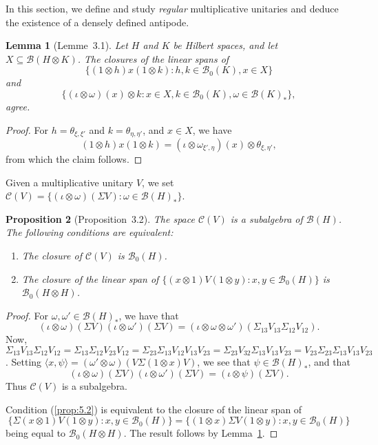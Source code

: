 \documentclass[a4paper,12pt]{article}
\theoremstyle{plain}
\newtheorem{proposition}{Proposition}[section]
\newtheorem{lemma}[proposition]{Lemma}
\theoremstyle{definition}
\newcommand{\ip}[2]{{\langle {#1} , {#2} \rangle}}
\newcommand{\mc}{\mathcal}
\begin{document}
In this section, we define and study \emph{regular} multiplicative unitaries
and deduce the existence of a densely defined antipode.

\begin{lemma}[Lemme~3.1]\label{lemma:1}
Let $H$ and $K$ be Hilbert spaces, and let $X\subseteq\mc B(H\otimes K)$.
The closures of the linear spans of
\[ \big\{ (1\otimes h)x(1\otimes k) : h,k\in\mc B_0(K), x\in X \big\} \]
and
\[ \big\{ (\iota\otimes\omega)(x)\otimes k : x\in X, k\in\mc B_0(K),
\omega\in\mc B(K)_* \big\}, \]
agree.
\end{lemma}
\begin{proof}
For $h=\theta_{\xi,\xi'}$ and $k=\theta_{\eta,\eta'}$, and $x\in X$, we have
\[ (1\otimes h)x(1\otimes k) = (\iota\otimes\omega_{\xi',\eta})(x)
\otimes \theta_{\xi,\eta'}, \]
from which the claim follows.
\end{proof}

Given a multiplicative unitary $V$, we set $\mc C(V) =
\{ (\iota\otimes\omega)(\Sigma V) : \omega\in\mc B(H)_* \}$.

\begin{proposition}[Proposition~3.2]\label{prop:5}
The space $\mc C(V)$ is a subalgebra of $\mc B(H)$.  The following conditions
are equivalent:
\begin{enumerate}
\item\label{prop:5.1} The closure of $\mc C(V)$ is $\mc B_0(H)$.
\item\label{prop:5.2} The closure of the linear span of
$\{ (x\otimes 1)V(1\otimes y) : x,y\in\mc B_0(H) \}$ is $\mc B_0(H\otimes H)$.
\end{enumerate}
\end{proposition}
\begin{proof}
For $\omega,\omega'\in\mc B(H)_*$, we have that
\[ (\iota\otimes\omega)(\Sigma V) (\iota\otimes\omega')(\Sigma V)
= (\iota\otimes\omega\otimes\omega')(\Sigma_{13} V_{13} \Sigma_{12} V_{12}). \]
Now, $\Sigma_{13} V_{13} \Sigma_{12} V_{12} =
\Sigma_{13} \Sigma_{12} V_{23} V_{12}
= \Sigma_{23} \Sigma_{13} V_{12} V_{13} V_{23}
= \Sigma_{23} V_{32} \Sigma_{13} V_{13} V_{23}
= V_{23} \Sigma_{23} \Sigma_{13} V_{13} V_{23}$.
Setting $\ip{x}{\psi} = (\omega'\otimes\omega)(V\Sigma(1\otimes x)V)$,
we see that $\psi\in\mc B(H)_*$, and that
\[ (\iota\otimes\omega)(\Sigma V) (\iota\otimes\omega')(\Sigma V)
= (\iota\otimes\psi)(\Sigma V). \]
Thus $\mc C(V)$ is a subalgebra.

Condition (\ref{prop:5.2}) is equivalent to the closure of the linear span
of
\[ \{ \Sigma(x\otimes 1)V(1\otimes y) : x,y\in\mc B_0(H) \}
= \{ (1\otimes x)\Sigma V(1\otimes y) : x,y\in\mc B_0(H) \} \]
being equal to $\mc B_0(H\otimes H)$.
The result follows by Lemma~\ref{lemma:1}.
\end{proof}
\end{document}
